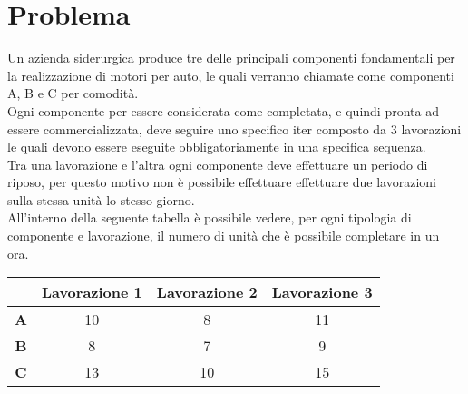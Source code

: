 \documentclass[12pt]{article}
\begin{document}
	

	\newpage
	
	\tableofcontents
	
	\newpage
	
	\section{Problema}
	Un azienda siderurgica produce tre delle principali componenti fondamentali per la realizzazione di motori per auto, le quali verranno chiamate come componenti A, B e C per comodità.\\
	Ogni componente per essere considerata come completata, e quindi pronta ad essere commercializzata, deve seguire uno specifico iter composto da 3 lavorazioni le quali devono essere eseguite obbligatoriamente in una specifica sequenza.\\
	Tra una lavorazione e l'altra ogni componente deve effettuare un periodo di riposo, per questo motivo non è possibile effettuare effettuare due lavorazioni sulla stessa unità lo stesso giorno.\\
	All'interno della seguente tabella è possibile vedere, per ogni tipologia di componente e lavorazione, il numero di unità che è possibile completare in un ora.
	
	\begin{table}[H]
		\setlength{\tabcolsep}{15pt} %
		\renewcommand{\arraystretch}{2} %
		\begin{center}
			\begin{tabular}{|c|c|c|c|}
				\hline
				& \textbf{Lavorazione 1} & \textbf{Lavorazione 2} & \textbf{Lavorazione 3} \\ \hline
				\textbf{A} &      10      &      8      &    11        \\ \hline
				\textbf{B} &       8     &       7     &      9      \\ \hline
				\textbf{C} &        13    &      10      &    15       \\ \hline
			\end{tabular}
		\end{center}
	\end{table}
\end{document}
